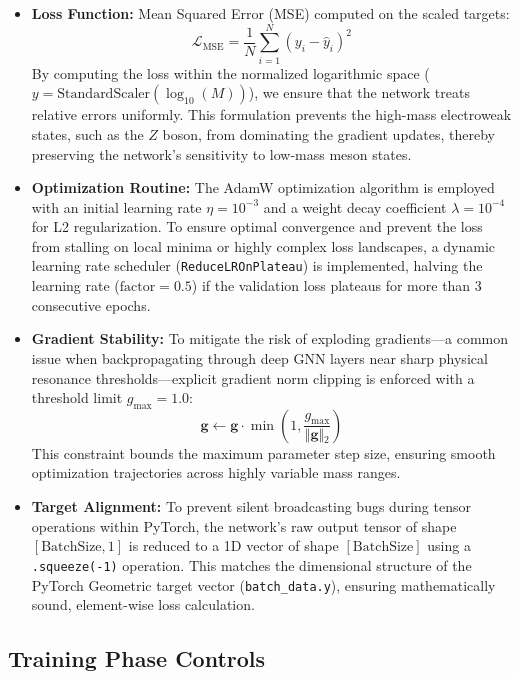 \documentclass[11pt,a4paper]{article}
\begin{document}
\begin{itemize}
    \item \textbf{Loss Function:} Mean Squared Error (MSE) computed on the scaled targets:
    \begin{equation}
    \mathcal{L}_{\text{MSE}} = \frac{1}{N} \sum_{i=1}^{N} (y_i - \hat{y}_i)^2
    \end{equation}
    By computing the loss within the normalized logarithmic space ($y = \text{StandardScaler}(\log_{10}(M))$), we ensure that the network treats relative errors uniformly. This formulation prevents the high-mass electroweak states, such as the $Z$ boson, from dominating the gradient updates, thereby preserving the network's sensitivity to low-mass meson states.

    \item \textbf{Optimization Routine:} The AdamW optimization algorithm is employed with an initial learning rate $\eta = 10^{-3}$ and a weight decay coefficient $\lambda = 10^{-4}$ for L2 regularization. To ensure optimal convergence and prevent the loss from stalling on local minima or highly complex loss landscapes, a dynamic learning rate scheduler (\texttt{ReduceLROnPlateau}) is implemented, halving the learning rate ($\text{factor} = 0.5$) if the validation loss plateaus for more than 3 consecutive epochs.

    \item \textbf{Gradient Stability:} To mitigate the risk of exploding gradients—a common issue when backpropagating through deep GNN layers near sharp physical resonance thresholds—explicit gradient norm clipping is enforced with a threshold limit $g_{\text{max}} = 1.0$:
    \begin{equation}
    \mathbf{g} \longleftarrow \mathbf{g} \cdot \min\left(1, \frac{g_{\text{max}}}{\Vert{}\mathbf{g}\Vert{}_2}\right)
    \end{equation}
    This constraint bounds the maximum parameter step size, ensuring smooth optimization trajectories across highly variable mass ranges.

    \item \textbf{Target Alignment:} To prevent silent broadcasting bugs during tensor operations within PyTorch, the network's raw output tensor of shape $[\text{BatchSize}, 1]$ is reduced to a 1D vector of shape $[\text{BatchSize}]$ using a \texttt{.squeeze(-1)} operation. This matches the dimensional structure of the PyTorch Geometric target vector (\texttt{batch\_data.y}), ensuring mathematically sound, element-wise loss calculation.
    
\end{itemize}\subsection{Training Phase Controls}
\end{document}
